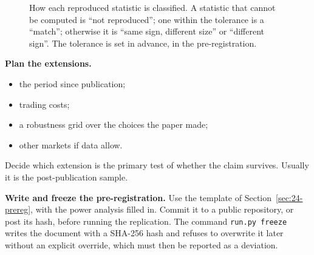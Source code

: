 \begin{figure}[htbp]
\centering
{}
\caption{How each reproduced statistic is classified. A statistic that cannot be computed is ``not reproduced''; one within the tolerance is a ``match''; otherwise it is ``same sign, different size'' or ``different sign''. The tolerance is set in advance, in the pre-registration.}
\label{fig:24-status}
\end{figure}

\textbf{Plan the extensions.}

\begin{itemize}
  \item the period since publication;
  \item trading costs;
  \item a robustness grid over the choices the paper made;
  \item other markets if data allow.
\end{itemize}

Decide which extension is the primary test of whether the claim survives. Usually it is the post-publication sample.

\textbf{Write and freeze the pre-registration.} Use the template of Section~\ref{sec:24-prereg}, with the power analysis filled in. Commit it to a public repository, or post its hash, before running the replication. The command \texttt{run.py freeze} writes the document with a SHA-256 hash and refuses to overwrite it later without an explicit override, which must then be reported as a deviation.

